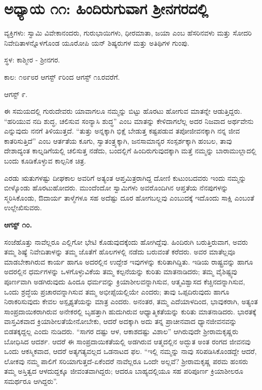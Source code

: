 
\chapter{ಅಧ್ಯಾಯ ೧೧: ಹಿಂದಿರುಗುವಾಗ ಶ‍್ರೀನಗರದಲ್ಲಿ}

ವ್ಯಕ್ತಿಗಳು: ಸ್ವಾಮಿ ವಿವೇಕಾನಂದರು, ಗುರುಭಾಯಿಗಳು, ಧೀರಮಾತಾ, ಜಯಾ ಎಂಬ ಹೆಸರಿನವಳು ಮತ್ತು ಸೋದರಿ ನಿವೇದಿತಾಳನ್ನೊಳಗೊಂಡ ಯೂರೋಪಿ ಯನ್ ಶಿಷ್ಯರುಗಳ ಮತ್ತು ಅತಿಥಿಗಳ ಗುಂಪು.

ಸ್ಥಳ: ಕಾಶ್ಮೀರ - ಶ‍್ರೀನಗರ.

ಕಾಲ: ೧೮೯೮ರ ಆಗಸ್ಟ್ ೯ರಿಂದ ಆಗಸ್ಟ್ ೧೩ರವರೆಗೆ.

ಆಗಸ್ಟ್ ೯.

ಈ ಸಮಯದಲ್ಲಿ ಗುರುದೇವರು ಯಾವಾಗಲೂ ನಮ್ಮನ್ನು ಬಿಟ್ಟು ಹೊರಟು ಹೋಗುವ ಮಾತನ್ನೇ ಆಡುತ್ತಿದ್ದರು. “ಹರಿಯುವ ನದಿ ಶುದ್ಧ, ಚಲಿಸುವ ಸಂನ್ಯಾಸಿ ಶುದ್ಧ” ಎಂಬ ಮಾತನ್ನು ಕೇಳಿದಾಗಲೆಲ್ಲ ಅದರ ನಿಜವಾದ ಅರ್ಥವೇನು ಎನ್ನುವುದು ನನಗೆ ತಿಳಿಯುತ್ತದೆ. “ತುತ್ತು ಅನ್ನಕ್ಕಾಗಿ ಭಿಕ್ಷೆ ಬೇಡುತ್ತ ಕಷ್ಟಪಡುವ ತಪೋಜೀವನಕ್ಕಾಗಿ ನನ್ನ ಜೀವ ಕಾತರಿಸುತ್ತಿದೆ” ಎಂಬ ಆರ್ತತೆಯ ಕೂಗು, ಸ್ವಾತಂತ್ರ್ಯಕ್ಕಾಗಿ, ಜನಸಾಮಾನ್ಯರ ಸಂಸ್ಪರ್ಶಕ್ಕಾಗಿ ಹಂಬಲ, ತಾವು ದೇಶಾದ್ಯಂತ ಕಾಲ್ನಡಿಗೆಯಲ್ಲಿ ಚಲಿಸುತ್ತ ನಡೆದು, ಬಂದಲ್ಲಿಗೆ ಹಿಂದಿರುಗುವುದಕ್ಕಾಗಿ ಮತ್ತೆ ನಮ್ಮನ್ನು ಬಾರಾಮುಲ್ಲಾದಲ್ಲಿ ಬಂದು ಕೂಡಿಕೊಳ್ಳುವ ಕಾಲ್ಪನಿಕ ಚಿತ್ರ.

ಎರಡು ಋತುಗಳಷ್ಟು ದೀಘಕಾಲ ಅವರಿಗೆ ಅತ್ಯಂತ ಆಪ್ತಮಿತ್ರರಾಗಿದ್ದ ದೋಣಿ ಕುಟುಂಬದವರು ಇಂದು ನಮ್ಮನ್ನು ಬೀಳ್ಕೊಂಡು ಹೊರಟುಹೋದರು. ಮುಂದೆಂದೋ ಸ್ವಾಮಿಗಳು ಅವರೊಂದಿಗಿನ ಆಪ್ತತೆಯ ನೆನಪುಗಳನ್ನು ಸ್ಮರಿಸಿಕೊಂಡು, ಔದಾರ್ಯ ತಾಳ್ಮೆಗಳೂ ಸಹ ಅದೆಷ್ಟು ದೂರ ಹೋಗಬಲ್ಲವು ಎಂಬುದಕ್ಕೆ ಇದೊಂದು ಸಾಕ್ಷಿ ಎಂಬಂತೆ ಉಲ್ಲೇಖಿಸುವರು.

\textbf{ಆಗಸ್ಟ್ ೧೦.}

ಸಂಜೆಹೊತ್ತು ನಾವೆಲ್ಲರೂ ಎಲ್ಲಿಗೋ ಭೇಟಿ ಕೊಡುವುದಕ್ಕೆಂದು ಹೋಗಿದ್ದೆವು. ಹಿಂದಿರುಗಿ ಬರುತ್ತಿರುವಾಗ, ಅವರು ತಮ್ಮ ಶಿಷ್ಯೆ ನಿವೇದಿತಾಳನ್ನು ತಮ್ಮ ಜೊತೆಗೆ ಹೊಲಗಳಲ್ಲಿ ನಡೆದು ಬರುವಂತೆ ಕರೆದರು. ಅವರ ಮಾತೆಲ್ಲವೂ ಮಾಡಬೇಕಾಗಿರುವ ಕಾರ್ಯ ಹಾಗೂ ಅದರಲ್ಲಿನ ಉದ್ದೇಶ ಇವುಗಳನ್ನು ಕುರಿತಾಗಿದ್ದಿತು. ಇಡಿಯ ರಾಷ್ಟ್ರವನ್ನು ಹಾಗೂ ಅದರಲ್ಲಿನ ಧರ್ಮಗಳನ್ನು ಒಳಗೊಳ್ಳುವಿಕೆಯ ತಮ್ಮ ಕಲ್ಪನೆಯನ್ನು ಕುರಿತು ಮಾತನಾಡಿದರು; ತಮ್ಮ ವೈಶಿಷ್ಟ್ಯವು ಪೂರ್ಣವಾಗಿ ಅಡಗಿರುವುದು ಹಿಂದೂ ಧರ್ಮವನ್ನು ಕ್ರಿಯಾಶೀಲವನ್ನಾಗಿಸುವ, ಆತ್ಮವಿಶ್ವಾಸದ ಕೆಚ್ಚಿನದನ್ನಾಗಿಸುವ, ಒಂದು ಶ್ರದ್ಧೆಯ ಪ್ರಚಾರವನ್ನಾಗಿಸುವ ತಮ್ಮ ಅಭೀಪ್ಸೆಯಲ್ಲಿಯೇ ಎಂದರು; ತಾವು ಒಪ್ಪದಿರುವುದು ಹಾಗೂ ನಿರಾಕರಿಸುವುದು ಕೇವಲ ಅಸ್ಪೃಶ್ಯತೆಯನ್ನು ಮಾತ್ರ ಎಂದರು. ಅನಂತರ, ತಮ್ಮ ಎದೆಯಾಳದಿಂದ, ಭಾವುಕರಾಗಿ, ಅತ್ಯಂತ ಸಾಂಪ್ರದಾಯಿಕರಾಗಿರುವ ಅನೇಕರಲ್ಲಿ ಬೃಹತ್ತಾಗಿ ಹುದುಗಿರುವ ಆಧ್ಯಾತ್ಮಿಕತೆಯನ್ನು ಕುರಿತು ಮಾತನಾಡಿದರು. ಭಾರತಕ್ಕೆ ವಾಸ್ತವಿಕವಾದ ಕ್ರಿಯಾಶೀಲತೆಯೇನೋಬೇಕು, ಆದರೆ ಅದಕ್ಕಾಗಿ ಅದು ತನ್ನ ಪ್ರಾಚೀನವಾದ ಧ್ಯಾನಜೀವನವನ್ನು ಬಿಡತಕ್ಕದ್ದಲ್ಲ ಎಂದು ನುಡಿದರು. “ಸಾಗರ ದಷ್ಟು ಆಳ, ಆಕಾಶದಷ್ಟು ವಿಶಾಲ” ಆಗಿರುವುದೇ ಶ‍್ರೀರಾಮಕೃಷ್ಣರು ಬೋಧಿಸಿದ ಆದರ್ಶ. ಆದರೆ ಈ ಸಾಂಪ್ರದಾಯಿಕತೆಯಲ್ಲಿ ಅಡಗಿರುವ ಆತ್ಮದಲ್ಲಿನ ಅದ್ಭುತ ಅಂತ ರಂಗದ ಜೀವನವು ಒಂದು ಆಕಸ್ಮಿಕವಾದ, ಆದರೆ ಅತ್ಯಗತ್ಯವಲ್ಲದ ಒಡನಾಟದ ಫಲ. “ಇಲ್ಲಿ ನಮ್ಮನ್ನು ನಾವು ಸರಿಪಡಿಸಿಕೊಂಡದ್ದೇ ಆದರೆ, ಲೋಕವು ನಮ್ಮ ಪಾಲಿಗೆ ಸರಿಯಾಗುತ್ತದೆ-ಏಕೆಂದರೆ ನಾವೆಲ್ಲರೂ ಒಂದೇ ಅಲ್ಲವೆ? ಶ‍್ರೀರಾಮಕೃಷ್ಣ ಪರಮ ಹಂಸರು ತಮ್ಮ ಅಸ್ತಿತ್ವದ ಆಳದುದ್ದಕ್ಕೂ ಜೀವಂತವಾಗಿದ್ದರು; ಆದರೂ ಬಾಹ್ಯದಲ್ಲಿಯೂ ಸಹ ಪರಿಪೂರ್ಣ ಕ್ರಿಯಾಶೀಲರೂ ಸಮರ್ಥರೂ ಆಗಿದ್ದರು”.

